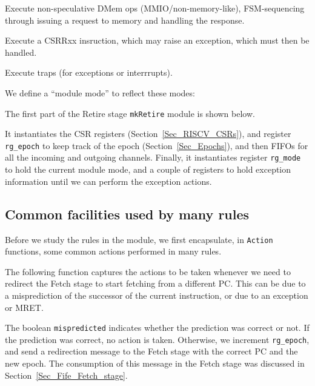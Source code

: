 \begin{tightlist}

 \item Execute non-speculative DMem ops (MMIO/non-memory-like),
        FSM-sequencing through issuing a request to memory and
        handling the response.

 \item Execute a CSRRxx insruction, which may raise an exception,
       which must then be handled.

 \item Execute traps (for exceptions or interrrupts).

\end{tightlist}

We define a ``module mode'' to reflect these modes:


The first part of the Retire stage \verb|mkRetire| module is shown below.


It instantiates the CSR registers (Section~\ref{Sec_RISCV_CSRs}), and
register \verb|rg_epoch| to keep track of the epoch
(Section~\ref{Sec_Epochs}), and then FIFOs for all the incoming and
outgoing channels.  Finally, it instantiates register \verb|rg_mode|
to hold the current module mode, and a couple of registers to hold
exception information until we can perform the exception actions.


\subsection{Common facilities used by many rules}

\label{Sec_Retire_Common}

Before we study the rules in the module, we first encapsulate, in
\verb|Action| functions, some common actions performed in many rules.

The following function captures the actions to be taken whenever we
need to redirect the Fetch stage to start fetching from a different
PC.  This can be due to a misprediction of the successor of the
current instruction, or due to an exception or MRET.


The boolean \verb|mispredicted| indicates whether the prediction was
correct or not.  If the prediction was correct, no action is taken.
Otherwise, we increment \verb|rg_epoch|, and send a redirection
message to the Fetch stage with the correct PC and the new epoch.  The
consumption of this message in the Fetch stage was discussed in
Section~\ref{Sec_Fife_Fetch_stage}.

